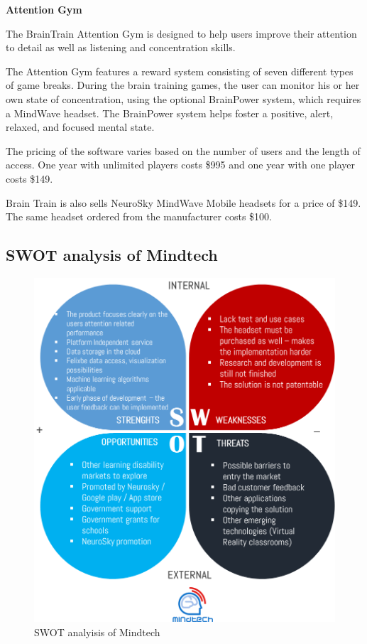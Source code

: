 \documentclass[letterpaper,10pt]{article}
\let\oldsubsection\subsection
\renewcommand{\subsection}{\def\cursectioning{subsection}\oldsubsection}
\begin{document}
\textbf{Attention Gym}


The BrainTrain Attention Gym is designed to help users improve their attention to detail as well as listening and concentration skills. 

The Attention Gym features a reward system consisting of seven different types of game breaks. During the brain training games, the user can monitor his or her own state of concentration, using the optional BrainPower system, which requires a MindWave headset. The BrainPower system helps foster a positive, alert, relaxed, and focused mental state.

The pricing of the software varies based on the number of users and the length of access.  
One year with unlimited players costs \$995 and one year with one player costs \$149.
 
Brain Train is also sells NeuroSky MindWave Mobile headsets for a price of \$149. The same headset ordered from the manufacturer costs \$100.

\cite{braintrain}

 
\subsection{SWOT analysis of Mindtech}

\begin{figure}[!htb]
\centering
\includegraphics[scale=0.4]{swotketto.png}
\caption{SWOT analyisis of Mindtech}
\label{img:mindtechswoti}
\end{figure}
\end{document}
